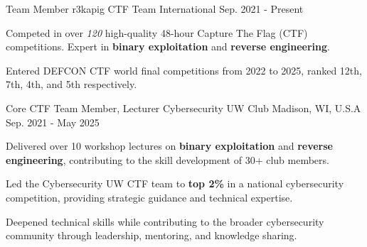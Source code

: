 

\begin{cventries}

  \cventry
    {Team Member} %
    {r3kapig CTF Team} %
    {International} %
    {Sep. 2021 - Present} %
    {
      \begin{cvitems} %
        \item {Competed in over \textit{120} high-quality 48-hour Capture The Flag (CTF) competitions. Expert in \textbf{binary exploitation} and \textbf{reverse engineering}.}
          \item {Entered DEFCON CTF world final competitions from 2022 to 2025, ranked 12th, 7th, 4th, and 5th respectively.}
      \end{cvitems}
    }

  \cventry
    {Core CTF Team Member, Lecturer} %
    {Cybersecurity UW Club} %
    {Madison, WI, U.S.A} %
    {Sep. 2021 - May 2025} %
    {
      \begin{cvitems} %
        \item {Delivered over 10 workshop lectures on \textbf{binary exploitation} and \textbf{reverse engineering}, contributing to the skill development of 30+ club members.}
        \item {Led the Cybersecurity UW CTF team to \textbf{top 2\%} in a national cybersecurity competition, providing strategic guidance and technical expertise.}
        \item {Deepened technical skills while contributing to the broader cybersecurity community through leadership, mentoring, and knowledge sharing.}
      \end{cvitems}
    }


\end{cventries}
